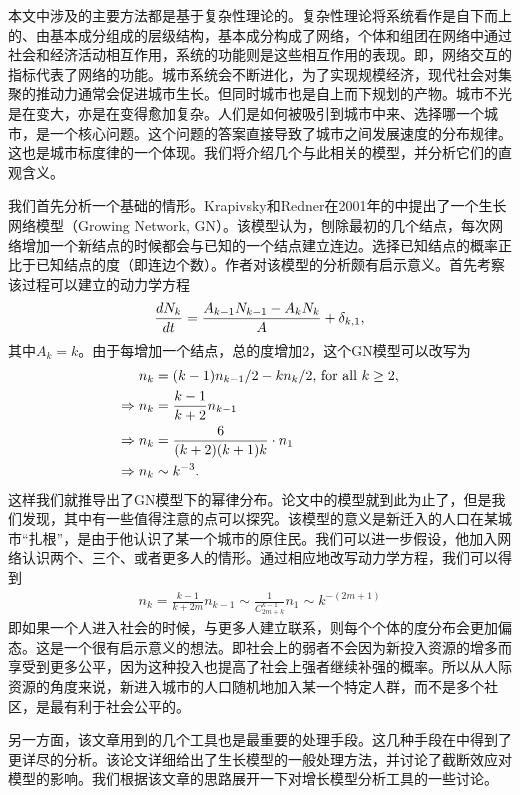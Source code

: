 本文中涉及的主要方法都是基于复杂性理论的。复杂性理论将系统看作是自下而上的、由基本成分组成的层级结构，基本成分构成了网络，个体和组团在网络中通过社会和经济活动相互作用，系统的功能则是这些相互作用的表现。即，网络交互的指标代表了网络的功能。城市系统会不断进化，为了实现规模经济，现代社会对集聚的推动力通常会促进城市生长。但同时城市也是自上而下规划的产物。城市不光是在变大，亦是在变得愈加复杂。人们是如何被吸引到城市中来、选择哪一个城市，是一个核心问题。这个问题的答案直接导致了城市之间发展速度的分布规律。这也是城市标度律的一个体现。我们将介绍几个与此相关的模型，并分析它们的直观含义。

我们首先分析一个基础的情形。Krapivsky和Redner在2001年的\cite{PhysRevE.63.066123}中提出了一个生长网络模型（Growing Network, GN）。该模型认为，刨除最初的几个结点，每次网络增加一个新结点的时候都会与已知的一个结点建立连边。选择已知结点的概率正比于已知结点的度（即连边个数）。作者对该模型的分析颇有启示意义。首先考察该过程可以建立的动力学方程
\begin{align} 
    \frac{dN_k}{dt} = \frac{A_{k-1}N_{k-1} - A_k N_k}{A} + \delta_{k,1},\notag
\end{align}其中$A_k=k$。由于每增加一个结点，总的度增加2，这个GN模型可以改写为\begin{align}n_k &= (k-1)n_{k-1}/2 - kn_{k}/2 \text{, for all }k \geq 2, \notag\\
    \Rightarrow n_k &= \frac{k-1}{k+2}n_{k-1}\notag\\ 
    \Rightarrow n_k &= \frac{6}{(k+2)(k+1)k}\cdot n_1\notag\\ 
    \Rightarrow n_k &\sim k^{-3}.
\end{align}这样我们就推导出了GN模型下的幂律分布。论文中的模型就到此为止了，但是我们发现，其中有一些值得注意的点可以探究。该模型的意义是新迁入的人口在某城市“扎根”，是由于他认识了某一个城市的原住民。我们可以进一步假设，他加入网络认识两个、三个、或者更多人的情形。通过相应地改写动力学方程，我们可以得到\begin{align}
    n_k = \frac{k-1}{k+2m}n_{k-1}\sim\frac{1}{C_{2m+k}^{k-1}}n_1\sim k^{-(2m+1)} \label{degm}
\end{align}即如果一个人进入社会的时候，与更多人建立联系，则每个个体的度分布会更加偏态。这是一个很有启示意义的想法。即社会上的弱者不会因为新投入资源的增多而享受到更多公平，因为这种投入也提高了社会上强者继续补强的概率。所以从人际资源的角度来说，新进入城市的人口随机地加入某一个特定人群，而不是多个社区，是最有利于社会公平的。

另一方面，该文章用到的几个工具也是最重要的处理手段。这几种手段在\cite{Bagrow_2008}中得到了更详尽的分析。该论文详细给出了生长模型的一般处理方法，并讨论了截断效应对模型的影响。我们根据该文章的思路展开一下对增长模型分析工具的一些讨论。

